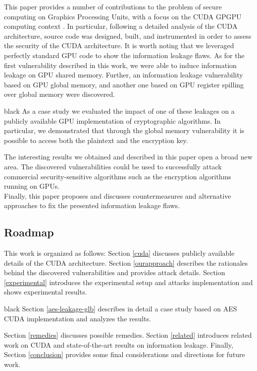\documentclass[11pt,onecolumn,letterpaper]{IEEEtran}
\newcommand{\clr}{black}
\begin{document}
This paper provides a number of contributions to the problem of secure computing on Graphics Processing Units, with a focus on 
the CUDA GPGPU computing context \cite{gpgpu}.
In particular, following a detailed analysis of the CUDA architecture, source code was designed, built, and instrumented in order to
assess the security of the  CUDA architecture. 
It is worth noting that we leveraged perfectly standard GPU code to show the information leakage flaws.
As for the first vulnerability described in this work, we were able to induce information leakage on GPU shared memory.
Further, an information leakage vulnerability based on GPU global memory,
and another one based on GPU register spilling over global memory were discovered.
\begin{color}{\clr}
As a case study we evaluated the impact of one of these leakages on a publicly available GPU implementation of cryptographic algorithms. 
In particular, we demonstrated that through the global memory vulnerability it is possible to access both the plaintext and the encryption key. 
\end{color}
The interesting results we obtained and described in this paper open a broad new area. 
The discovered vulnerabilities could be used to successfully attack commercial security-sensitive algorithms such as the encryption algorithms running on GPUs.\\
Finally, this paper proposes and discusses countermeasures and alternative approaches to fix the presented information leakage flaws.

\subsection{Roadmap}
This work is organized as follows:
Section \ref{cuda} discusses publicly available details of the CUDA architecture.
Section \ref{ourapproach} describes the rationales behind the discovered vulnerabilities and provides attack details.
Section \ref{experimental} introduces the experimental setup and attacks implementation and shows experimental results.
\begin{color}{\clr}
Section \ref{aes-leakage-glb} describes in detail a case study based on AES CUDA implementation and analyzes the results.
\end{color}
Section \ref{remedies} discusses possible remedies. 
Section \ref{related} introduces related work on CUDA and state-of-the-art results on information leakage.
Finally, Section \ref{conclusion} provides some final considerations and directions for future work. 
\end{document}

